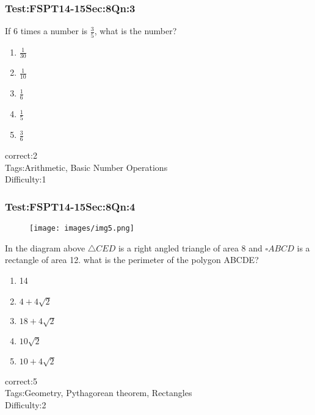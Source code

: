 \documentclass[]{beamer}
\begin{document}
    \begin{frame}
	    \frametitle{Test:FSPT14-15\hspace{2mm}Sec:8\hspace{2mm}Qn:3}
	    If 6 times a number is $\frac{3}{5}$, what is the number?
	    \begin{enumerate}
			\item
	           $\frac{1}{30}$	        
	        \item
	           $\frac{1}{10}$
	        \item
	            $\frac{1}{6}$
	        \item
	            $\frac{1}{5}$
	        \item
	           $\frac{3}{6}$
	         
	    \end{enumerate}
	    correct:2  \\   
	    Tags:Arithmetic, Basic Number Operations    \\
	    Difficulty:1   \\
    \end{frame}
    \begin{frame}
	    \frametitle{Test:FSPT14-15\hspace{2mm}Sec:8\hspace{2mm}Qn:4}
	    \begin{figure}
	    \begin{center}
			\texttt{[image: images/img5.png]}
	    \end{center}
	    \end{figure}
	    	    In the diagram above $\bigtriangleup CED$ is a right angled triangle of area 8 and $\square ABCD$ is a rectangle of area 12. what is the perimeter of the polygon ABCDE?
	    \begin{enumerate}
	        \item
	            14
	        \item
	           $4+4\sqrt{2}$
	        \item
	           $18+4\sqrt{2}$
	        \item
	            $10\sqrt{2}$
	        \item
	            $10+4\sqrt{2}$
	    \end{enumerate}
	    correct:5  \\   
	    Tags:Geometry, Pythagorean theorem, Rectangles    \\
	    Difficulty:2   \\
    \end{frame}
\end{document}
